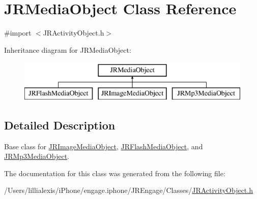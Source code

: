 \hypertarget{interface_j_r_media_object}{
\section{JRMediaObject Class Reference}
\label{interface_j_r_media_object}
}


{\ttfamily \#import $<$JRActivityObject.h$>$}

Inheritance diagram for JRMediaObject:\begin{figure}[H]
\begin{center}
\leavevmode
\includegraphics[height=2.000000cm]{interface_j_r_media_object}
\end{center}
\end{figure}


\subsection{Detailed Description}
Base class for {\ttfamily \hyperlink{interface_j_r_image_media_object}{JRImageMediaObject}}, {\ttfamily \hyperlink{interface_j_r_flash_media_object}{JRFlashMediaObject}}, and {\ttfamily \hyperlink{interface_j_r_mp3_media_object}{JRMp3MediaObject}}. 

The documentation for this class was generated from the following file:\begin{DoxyCompactItemize}
\item 
/Users/lillialexis/iPhone/engage.iphone/JREngage/Classes/\hyperlink{_j_r_activity_object_8h}{JRActivityObject.h}\end{DoxyCompactItemize}
